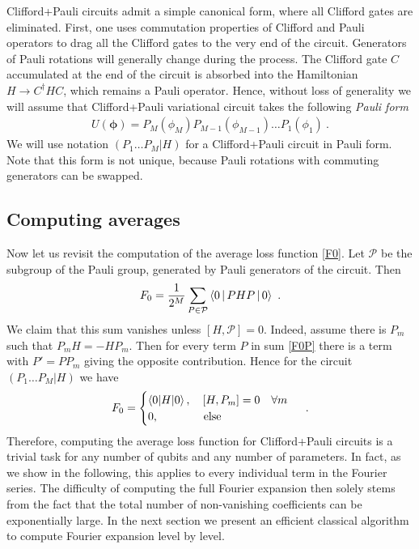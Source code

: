 \documentclass[twocolumn, amsfonts, amssymb, aps, nofootinbib]{revtex4-2}
\newcommand{\CP}{Clifford+Pauli}
\begin{document}
\CP{} circuits admit a simple canonical form, where all Clifford gates are eliminated. First, one uses commutation properties of Clifford and Pauli operators to drag all the Clifford gates to the very end of the circuit. Generators of Pauli rotations will generally change during the process. The Clifford gate $C$ accumulated at the end of the circuit is absorbed into the Hamiltonian $H\to C^\dagger H C$, which remains a Pauli operator. Hence, without loss of generality we will assume that \CP{} variational circuit takes the following \textit{Pauli form}
\begin{align}
	U(\pmb\phi)=P_M(\phi_M)P_{M-1}(\phi_{M-1})\dots P_1(\phi_1) \ .
\end{align}
We will use notation $(P_1\dots P_M|H)$ for a \CP{} circuit in Pauli form. Note that this form is not unique, because Pauli rotations with commuting generators can be swapped.

\subsection{Computing averages}
Now let us revisit the computation of the average loss function \eqref{F0}. Let $\mathcal{P}$ be the subgroup of the Pauli group, generated by Pauli generators of the circuit. Then
\begin{align}
	F_0=\frac{1}{2^M}\sum_{P\in \mathcal{P}}\Braket{0|PHP|0} \ . \label{F0P}
\end{align}
We claim that this sum vanishes unless $[H, \mathcal{P}]=0$. Indeed, assume there is $P_m$ such that $P_mH=-HP_m$. Then for every term $P$ in sum \eqref{F0P} there is a term with $P'=PP_m$ giving the opposite contribution. Hence for the circuit $(P_1\dots P_M|H)$ we have
\begin{align}
	F_0=\begin{cases} \braket{0|H|0},\quad [H, P_m] = 0\quad \forall m\\ 0,\qquad\qquad \text{else}\end{cases} \ .
\end{align}
Therefore, computing the average loss function for \CP{} circuits is a trivial task for any number of qubits and any number of parameters. In fact, as we show in the following, this applies to every individual term in the Fourier series. The difficulty of computing the full Fourier expansion then solely stems from the fact that the total number of non-vanishing coefficients can be exponentially large. In the next section we present an efficient classical algorithm to compute Fourier expansion level by level.
\end{document}
